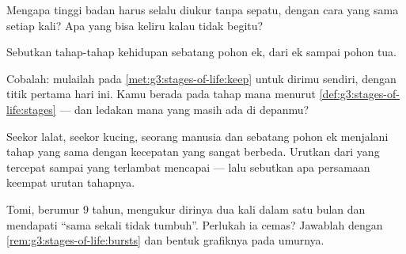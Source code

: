 \begin{exercise}[$\star$]\label{exo:g3:stages-of-life:6}
Mengapa tinggi badan harus selalu diukur tanpa sepatu, dengan cara
yang sama setiap kali? Apa yang bisa keliru kalau tidak begitu?
\end{exercise}

\begin{exercise}[$\star$]\label{exo:g3:stages-of-life:7}
Sebutkan tahap-tahap kehidupan sebatang pohon ek, dari  ek sampai
pohon tua.
\end{exercise}

\begin{exercise}[$\star$]\label{exo:g3:stages-of-life:8}
Cobalah: mulailah  pada
\cref{met:g3:stages-of-life:keep} untuk dirimu sendiri, dengan titik
pertama hari ini. Kamu berada pada tahap mana menurut
\cref{def:g3:stages-of-life:stages} --- dan ledakan mana yang masih
ada di depanmu?
\end{exercise}

\begin{exercise}[$\star\star$]\label{exo:g3:stages-of-life:9}
Seekor lalat, seekor kucing, seorang manusia dan sebatang pohon ek
menjalani tahap yang sama dengan kecepatan yang sangat berbeda.
Urutkan dari yang tercepat sampai yang terlambat mencapai  ---
lalu sebutkan apa persamaan keempat urutan tahapnya.
\end{exercise}

\begin{exercise}[$\star\star$]\label{exo:g3:stages-of-life:10}
Tomi, berumur $9$ tahun, mengukur dirinya dua kali dalam satu bulan
dan mendapati ``sama sekali tidak tumbuh''. Perlukah ia cemas?
Jawablah dengan \cref{rem:g3:stages-of-life:bursts} dan bentuk
grafiknya pada umurnya.
\end{exercise}
